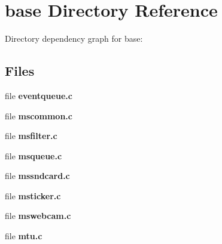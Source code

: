 \section{base Directory Reference}
\label{dir_0af1587c8378955de40f48b4bd1869f0}
Directory dependency graph for base\-:
\subsection*{Files}
\begin{DoxyCompactItemize}
\item 
file {\bfseries eventqueue.\-c}
\item 
file {\bfseries mscommon.\-c}
\item 
file {\bfseries msfilter.\-c}
\item 
file {\bfseries msqueue.\-c}
\item 
file {\bfseries mssndcard.\-c}
\item 
file {\bfseries msticker.\-c}
\item 
file {\bfseries mswebcam.\-c}
\item 
file {\bfseries mtu.\-c}
\end{DoxyCompactItemize}
